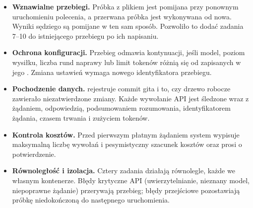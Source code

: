 \begin{itemize}
  \item \textbf{Wznawialne przebiegi.} Próbka z plikiem  jest pomijana przy
    ponownym uruchomieniu polecenia, a przerwana próbka jest wykonywana od nowa. Wyniki sędziego
    są pomijane w ten sam sposób. Pozwoliło to dodać zadania 7--10 do istniejącego przebiegu po ich
    napisaniu.
  \item \textbf{Ochrona konfiguracji.} Przebieg odmawia kontynuacji, jeśli model, poziom wysiłku,
    liczba rund naprawy lub limit tokenów różnią się od zapisanych w jego .
    Zmiana ustawień wymaga nowego identyfikatora przebiegu.
  \item \textbf{Pochodzenie danych.}  rejestruje commit gita i to, czy drzewo
    robocze zawierało niezatwierdzone zmiany. Każde wywołanie API jest śledzone wraz z żądaniem,
    odpowiedzią, podsumowaniem rozumowania, identyfikatorem żądania, czasem trwania i zużyciem
    tokenów.
  \item \textbf{Kontrola kosztów.} Przed pierwszym płatnym żądaniem system wypisuje maksymalną
    liczbę wywołań i pesymistyczny szacunek kosztów oraz prosi o potwierdzenie.
  \item \textbf{Równoległość i izolacja.} Cztery zadania działają równolegle, każde we własnym
    kontenerze. Błędy krytyczne API (uwierzytelnianie, nieznany model, niepoprawne żądanie)
    przerywają przebieg; błędy przejściowe pozostawiają próbkę niedokończoną do następnego
    uruchomienia.
\end{itemize}
